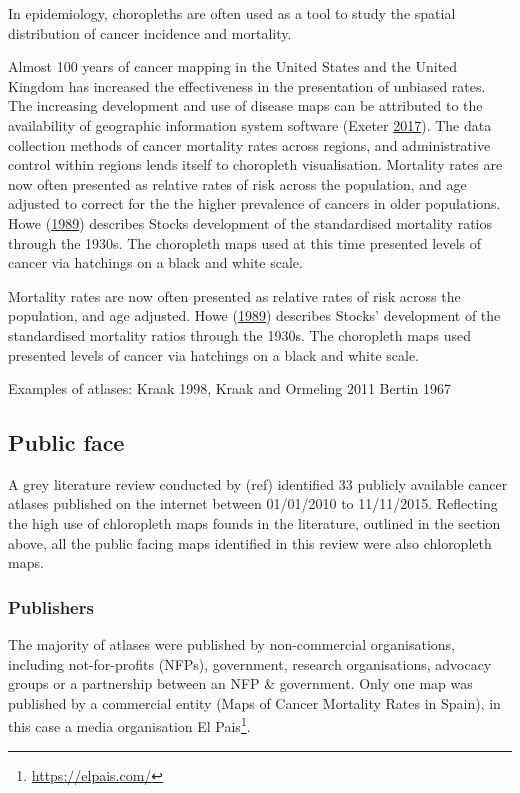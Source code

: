 \documentclass[11pt,]{article}
\let\rmarkdownfootnote\footnote%
\def\footnote{\protect\rmarkdownfootnote}
\begin{document}
In epidemiology, choropleths are often used as a tool to study the
spatial distribution of cancer incidence and mortality.

Almost 100 years of cancer mapping in the United States and the United
Kingdom has increased the effectiveness in the presentation of unbiased
rates. The increasing development and use of disease maps can be
attributed to the availability of geographic information system software
(Exeter \protect\hyperlink{ref-SE}{2017}). The data collection methods
of cancer mortality rates across regions, and administrative control
within regions lends itself to choropleth visualisation. Mortality rates
are now often presented as relative rates of risk across the population,
and age adjusted to correct for the the higher prevalence of cancers in
older populations. Howe (\protect\hyperlink{ref-HEDP}{1989}) describes
Stocks development of the standardised mortality ratios through the
1930s. The choropleth maps used at this time presented levels of cancer
via hatchings on a black and white scale.

Mortality rates are now often presented as relative rates of risk across
the population, and age adjusted. Howe
(\protect\hyperlink{ref-HEDP}{1989}) describes Stocks' development of
the standardised mortality ratios through the 1930s. The choropleth maps
used presented levels of cancer via hatchings on a black and white
scale.

Examples of atlases: Kraak 1998, Kraak and Ormeling 2011 Bertin 1967

\hypertarget{public-face}{%
\subsection{Public face}\label{public-face}}

A grey literature review conducted by (ref) identified 33 publicly
available cancer atlases published on the internet between 01/01/2010 to
11/11/2015. Reflecting the high use of chloropleth maps founds in the
literature, outlined in the section above, all the public facing maps
identified in this review were also chloropleth maps.

\hypertarget{publishers}{%
\subsubsection*{Publishers}\label{publishers}}

The majority of atlases were published by non-commercial organisations,
including not-for-profits (NFPs), government, research organisations,
advocacy groups or a partnership between an NFP \& government. Only one
map was published by a commercial entity (Maps of Cancer Mortality Rates
in Spain), in this case a media organisation El Pais\footnote{\url{https://elpais.com/}}.
\end{document}
